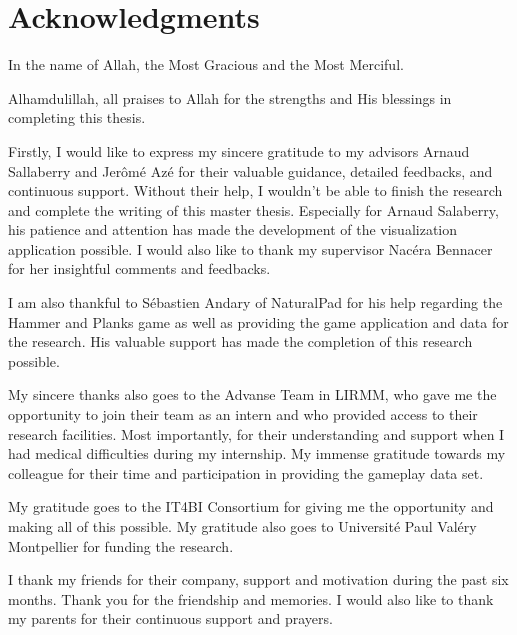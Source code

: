 \documentclass[a4paper,11pt,twoside]{ThesisStyle}
\begin{document}
\dominitoc

\cleardoublepage

\section*{Acknowledgments}

In the name of Allah, the Most Gracious and the Most Merciful.

Alhamdulillah, all praises to Allah for the strengths and His blessings in completing this thesis.

Firstly, I would like to express my sincere gratitude to my advisors Arnaud Sallaberry and Jer\^{o}m\'{e} Az\'{e} for their valuable guidance, detailed feedbacks, and continuous support. Without their help, I wouldn't be able to finish the research and complete the writing of this master thesis. Especially for Arnaud Salaberry, his patience and attention has made the development of the visualization application possible. I would also like to thank my supervisor  Nac\'{e}ra Bennacer for her insightful comments and feedbacks.

I am also thankful to S\'{e}bastien Andary of NaturalPad for his help regarding the Hammer and Planks game as well as providing the game application and data for the research. His valuable support has made the completion of this research possible.

My sincere thanks also goes to the Advanse Team in LIRMM, who gave me the opportunity to join their team as an intern and who provided access to their research facilities. Most importantly, for their understanding and support when I had medical difficulties during my internship.
My immense gratitude towards my colleague for their time and participation in providing the gameplay data set.


My gratitude goes to the IT4BI Consortium for giving me the opportunity and making all of this possible. My gratitude also goes to Universit\'{e} Paul Val\'{e}ry Montpellier for funding the research.

I thank my friends for their company, support and motivation during the past six months. Thank you for the friendship and memories. I would also like to thank my parents for their continuous support and prayers.  

\end{document}
